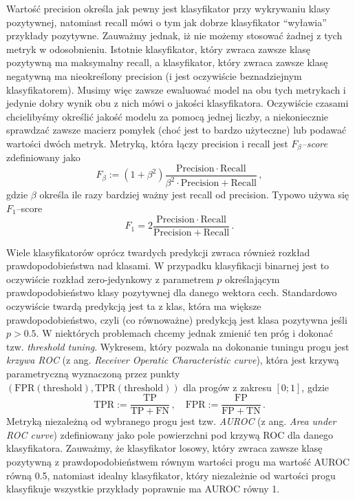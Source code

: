 \documentclass{myclass}
\numberwithin{equation}{subsection}
\begin{document}
Wartość precision określa jak pewny jest klasyfikator przy wykrywaniu klasy pozytywnej, natomiast
recall mówi o tym jak dobrze klasyfikator \enquote{wyławia} przykłady pozytywne. Zauważmy jednak, iż
nie możemy stosować żadnej z tych metryk w odosobnieniu. Istotnie klasyfikator, który zwraca zawsze
klasę pozytywną ma maksymalny recall, a klasyfikator, który zwraca zawsze klasę negatywną ma
nieokreślony precision (i jest oczywiście beznadziejnym klasyfikatorem). Musimy więc zawsze
ewaluować model na obu tych metrykach i jedynie dobry wynik obu z nich mówi o jakości klasyfikatora.
Oczywiście czasami chcielibyśmy określić jakość modelu za pomocą jednej liczby, a niekoniecznie
sprawdzać zawsze macierz pomyłek (choć jest to bardzo użyteczne) lub podawać wartości dwóch metryk.
Metryką, która łączy precision i recall jest \emph{\(F_\beta\)--score} zdefiniowany jako
\begin{equation}
    F_\beta := (1 + \beta^2) \frac{\mathrm{Precision} \cdot \mathrm{Recall}}{\beta^2 \cdot \mathrm{Precision} + \mathrm{Recall}}\,, 
\end{equation}
gdzie \(\beta\) określa ile razy bardziej ważny jest recall od precision. Typowo używa się
\(F_1\)--score
\begin{equation}
    F_1 = 2\frac{\mathrm{Precision} \cdot \mathrm{Recall}}{\mathrm{Precision} + \mathrm{Recall}}\,. 
\end{equation}

Wiele klasyfikatorów oprócz twardych predykcji zwraca również rozkład prawdopodobieństwa nad
klasami. W przypadku klasyfikacji binarnej jest to oczywiście rozkład zero-jedynkowy z parametrem
\(p\) określającym prawdopodobieństwo klasy pozytywnej dla danego wektora cech. Standardowo
oczywiście twardą predykcją jest ta z klas, która ma większe prawdopodobieństwo, czyli (co
równoważne) predykcją jest klasa pozytywna jeśli \(p > 0.5\). W niektórych problemach chcemy jednak
zmienić ten próg i dokonać tzw. \textit{threshold tuning}. Wykresem, który pozwala na dokonanie
tuningu progu jest \emph{krzywa ROC} (z ang. \textit{Receiver Operatic Characteristic curve}), która
jest krzywą parametryczną wyznaczoną przez punkty \((\mathrm{FPR}(\mathrm{threshold}),
\mathrm{TPR}(\mathrm{threshold}))\) dla progów z zakresu \([0;1]\), gdzie
\begin{equation}
    \mathrm{TPR} := \frac{\mathrm{TP}}{\mathrm{TP + FN}}\,,\quad \mathrm{FPR} := \frac{\mathrm{FP}}{\mathrm{FP + TN}}\,.
\end{equation}
Metryką niezależną od wybranego progu jest tzw. \emph{AUROC} (z ang. \textit{Area under ROC curve})
zdefiniowany jako pole powierzchni pod krzywą ROC dla danego klasyfikatora. Zauważmy, że
klasyfikator losowy, który zwraca zawsze klasę pozytywną z prawdopodobieństwem równym wartości progu
ma wartość AUROC równą 0.5, natomiast idealny klasyfikator, który niezależnie od wartości progu
klasyfikuje wszystkie przykłady poprawnie ma AUROC równy 1.
\end{document}
